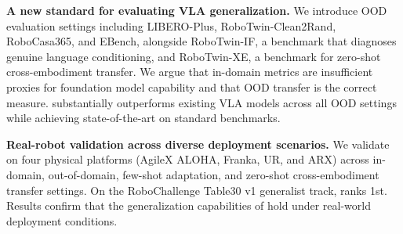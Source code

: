 \textbf{A new standard for evaluating VLA generalization.} We introduce OOD evaluation settings including LIBERO-Plus, RoboTwin-Clean2Rand, RoboCasa365, and EBench, alongside RoboTwin-IF, a benchmark that diagnoses genuine language conditioning, and RoboTwin-XE, a benchmark for zero-shot cross-embodiment transfer. We argue that in-domain metrics are insufficient proxies for foundation model capability and that OOD transfer is the correct measure. \ours substantially outperforms existing VLA models across all OOD settings while achieving state-of-the-art on standard benchmarks.

\textbf{Real-robot validation across diverse deployment scenarios.} 
We validate \ours on four physical platforms (AgileX ALOHA, Franka, UR, and ARX) across in-domain, out-of-domain, few-shot adaptation, and zero-shot cross-embodiment transfer settings.
On the RoboChallenge Table30 v1 generalist track, \ours ranks 1st.
Results confirm that the generalization capabilities of \ours hold under real-world deployment conditions.



